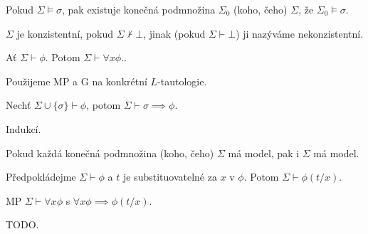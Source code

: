 \documentclass[12pt]{article}                   %
\begin{document}
        \begin{veta}[Kompaktnost]
            Pokud $\Sigma \models \sigma$, pak existuje konečná podmnožina $\Sigma_0$ (koho, čeho) $\Sigma$, že $\Sigma_0 \models \sigma$.
        \end{veta}

        \begin{definice}
            $\Sigma$ je konzistentní, pokud $\Sigma \nvdash \bot$, jinak (pokud $\Sigma \vdash \bot$) ji nazýváme nekonzistentní.
        \end{definice}

        \begin{lemma}
            Ať $\Sigma \vdash \phi$. Potom $\Sigma \vdash \forall x \phi$..

            \begin{dukazin}[Náznak]
                Použijeme MP a G na konkrétní $L$-tautologie.
            \end{dukazin}
        \end{lemma}

        \begin{lemma}[Dedukce]
            Nechť $\Sigma \cup \{\sigma\} \vdash \phi$, potom $\Sigma \vdash \sigma \implies \phi$.

            \begin{dukazin}
                Indukcí.
            \end{dukazin}
        \end{lemma}

        \begin{veta}
            Pokud každá konečná podmnožina (koho, čeho) $\Sigma$ má model, pak i $\Sigma$ má model.
        \end{veta}


        \begin{lemma}
            Předpokládejme $\Sigma \vdash \phi$ a $t$ je substituovatelné za $x$ v $\phi$. Potom $\Sigma \vdash \phi(t/x)$.

            \begin{dukazin}
                MP $\Sigma \vdash \forall x \phi$ s $\forall x \phi \implies \phi(t/x)$.
            \end{dukazin}
        \end{lemma}

        \begin{lemma}
            TODO.
        \end{lemma}
\end{document}
